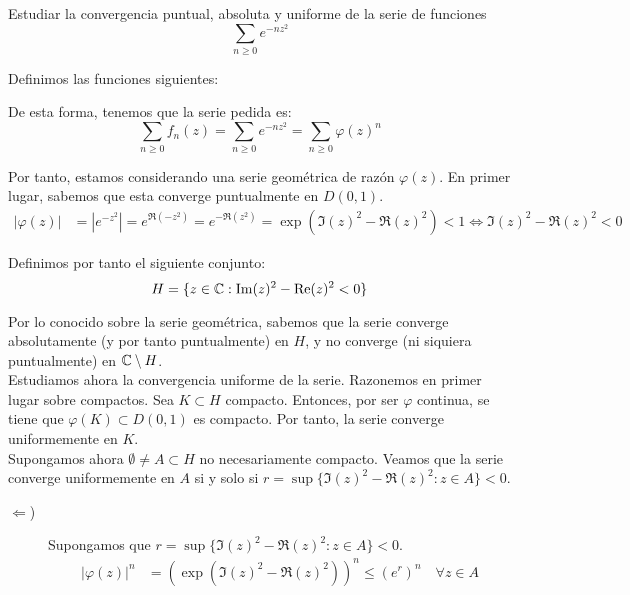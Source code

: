 \begin{ejercicio}
    Estudiar la convergencia puntual, absoluta y uniforme de la serie de funciones
    \[
        \sum_{n\geq 0} e^{-nz^2}
    \]

    Definimos las funciones siguientes:

    De esta forma, tenemos que la serie pedida es:
    \[
        \sum_{n\geq 0} f_n(z) = \sum_{n\geq 0} e^{-nz^2} = \sum_{n\geq 0} \varphi(z)^n
    \]

    Por tanto, estamos considerando una serie geométrica de razón $\varphi(z)$. En primer lugar, sabemos que esta converge puntualmente en $D(0,1)$.
    \begin{align*}
        |\varphi(z)| &= \left|e^{-z^2}\right| = e^{\Re(-z^2)} = e^{-\Re(z^2)} = 
        \exp(\Im(z)^2 - \Re(z)^2) < 1
        \iff \Im(z)^2 - \Re(z)^2 < 0
    \end{align*}

    Definimos por tanto el siguiente conjunto:
    \begin{equation*}
        H=\{z\in \mathbb{C} : \operatorname{Im}(z)^2 - \operatorname{Re}(z)^2 < 0\}
    \end{equation*}

    Por lo conocido sobre la serie geométrica, sabemos que la serie converge absolutamente (y por tanto puntualmente) en $H$, y no converge (ni siquiera puntualmente) en $\mathbb{C}\setminus H$.\\

    Estudiamos ahora la convergencia uniforme de la serie. Razonemos en primer lugar sobre compactos. Sea $K\subset H$ compacto. Entonces, por ser $\varphi$ continua, se tiene que $\varphi(K)\subset D(0,1)$ es compacto. Por tanto, la serie converge uniformemente en $K$.\\

    Supongamos ahora $\emptyset\neq A\subset H$ no necesariamente compacto. Veamos que la serie converge uniformemente en $A$ si y solo si $r=\sup\{\Im(z)^2 - \Re(z)^2 : z\in A\} < 0$.
    \begin{description}
        \item[$\Longleftarrow$)] Supongamos que $r=\sup\{\Im(z)^2 - \Re(z)^2 : z\in A\} < 0$. 
        \begin{align*}
            |\varphi(z)|^n &= \left(\exp(\Im(z)^2 - \Re(z)^2)\right)^n\leq \left(e^r\right)^n \quad \forall z\in A
        \end{align*}


\end{description}
\end{ejercicio}
